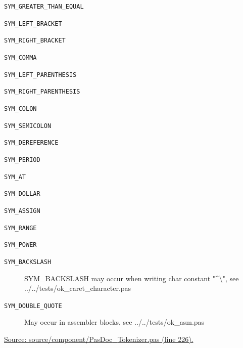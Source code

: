 \documentclass{report}
\newif\ifpdf
\begin{document}
\begin{list}{}
\begin{description}
\item[\texttt{SYM{\_}GREATER{\_}THAN{\_}EQUAL}] \label{PasDoc_Tokenizer-SYM_GREATER_THAN_EQUAL}
\index{}
 
\item[\texttt{SYM{\_}LEFT{\_}BRACKET}] \label{PasDoc_Tokenizer-SYM_LEFT_BRACKET}
\index{}
 
\item[\texttt{SYM{\_}RIGHT{\_}BRACKET}] \label{PasDoc_Tokenizer-SYM_RIGHT_BRACKET}
\index{}
 
\item[\texttt{SYM{\_}COMMA}] \label{PasDoc_Tokenizer-SYM_COMMA}
\index{}
 
\item[\texttt{SYM{\_}LEFT{\_}PARENTHESIS}] \label{PasDoc_Tokenizer-SYM_LEFT_PARENTHESIS}
\index{}
 
\item[\texttt{SYM{\_}RIGHT{\_}PARENTHESIS}] \label{PasDoc_Tokenizer-SYM_RIGHT_PARENTHESIS}
\index{}
 
\item[\texttt{SYM{\_}COLON}] \label{PasDoc_Tokenizer-SYM_COLON}
\index{}
 
\item[\texttt{SYM{\_}SEMICOLON}] \label{PasDoc_Tokenizer-SYM_SEMICOLON}
\index{}
 
\item[\texttt{SYM{\_}DEREFERENCE}] \label{PasDoc_Tokenizer-SYM_DEREFERENCE}
\index{}
 
\item[\texttt{SYM{\_}PERIOD}] \label{PasDoc_Tokenizer-SYM_PERIOD}
\index{}
 
\item[\texttt{SYM{\_}AT}] \label{PasDoc_Tokenizer-SYM_AT}
\index{}
 
\item[\texttt{SYM{\_}DOLLAR}] \label{PasDoc_Tokenizer-SYM_DOLLAR}
\index{}
 
\item[\texttt{SYM{\_}ASSIGN}] \label{PasDoc_Tokenizer-SYM_ASSIGN}
\index{}
 
\item[\texttt{SYM{\_}RANGE}] \label{PasDoc_Tokenizer-SYM_RANGE}
\index{}
 
\item[\texttt{SYM{\_}POWER}] \label{PasDoc_Tokenizer-SYM_POWER}
\index{}
 
\item[\texttt{SYM{\_}BACKSLASH}] \label{PasDoc_Tokenizer-SYM_BACKSLASH}
\index{}
SYM{\_}BACKSLASH may occur when writing char constant "{\^{}}{\textbackslash}", see ../../tests/ok{\_}caret{\_}character.pas
\item[\texttt{SYM{\_}DOUBLE{\_}QUOTE}] \label{PasDoc_Tokenizer-SYM_DOUBLE_QUOTE}
\index{}
May occur in assembler blocks, see ../../tests/ok{\_}asm.pas
\end{description}
\par
\href{https://github.com/pasdoc/pasdoc/blob/master/source/component/PasDoc_Tokenizer.pas#L226}{Source: source/component/PasDoc{\_}Tokenizer.pas (line 226).}

\end{list}
\ifpdf
\end{document}
